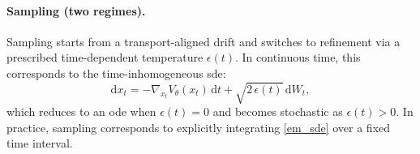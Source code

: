 \paragraph{Sampling (two regimes).}
Sampling starts from a transport-aligned drift and switches to refinement via a prescribed time-dependent temperature
$\epsilon(t)$. In continuous time, this corresponds to the time-inhomogeneous \gls{sde}:
\begin{equation}
\label{em_sde}
\mathrm{d}x_t
=
-\nabla_{x_t} V_\theta(x_t)\,\mathrm{d}t
+\sqrt{2\,\epsilon(t)}\,\mathrm{d}W_t,
\end{equation}
which reduces to an \gls{ode} when $\epsilon(t)=0$ and becomes stochastic as $\epsilon(t)> 0$.
In practice, sampling corresponds to explicitly integrating \eqref{em_sde} over a fixed time interval.
